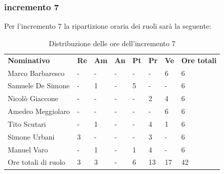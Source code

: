 \subsubsection{incremento 7}
Per l'incremento 7 la ripartizione oraria dei ruoli sarà la seguente:
\begin{center}
    \begin{table}[ht!]
        \centering
        \caption{Distribuzione delle ore dell'incremento 7}
        \vspace{5px}
        \renewcommand{\arraystretch}{1.8}
        \begin{tabular}{p{100px} p{20px} p{20px} p{20px} p{20px} p{20px} p{20px} p{50px} }
            \rowcolor{logo!70} \textbf{Nominativo} & \textbf{Re} & \textbf{Am} & \textbf{An} & \textbf{Pt} & \textbf{Pr} & \textbf{Ve} & \textbf{Ore totali} \\
            Marco Barbaresco                       & -           & -           & -           & -           & -           & 6           & 6                   \\
            Samuele De Simone                      & -           & 1           & -           & 5           & -           & -           & 6                   \\
            Nicolò Giaccone                        & -           & -           & -           & -           & 2           & 4           & 6                   \\
            Amedeo Meggiolaro                      & -           & -           & -           & -           & -           & 6           & 6                   \\
            Tito Scutari                           & -           & 1           & -           & -           & 4           & 1           & 6                   \\
            Simone Urbani                          & 3           & -           & -           & -           & 3           & -           & 6                   \\
            Manuel Varo                            & -           & 1           & -           & 1           & 4           & -           & 6                   \\
            Ore totali di ruolo                    & 3           & 3           & -           & 6           & 13          & 17          & 42                  \\
        \end{tabular}
    \end{table}
\end{center}
